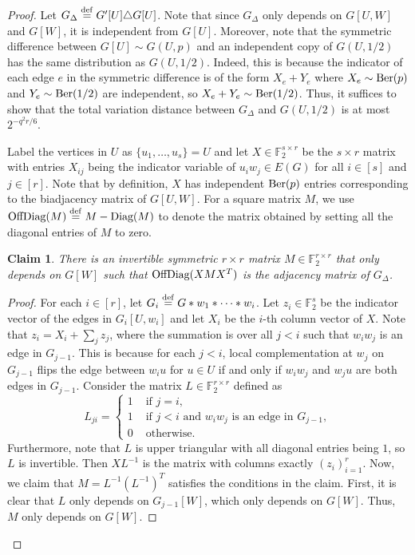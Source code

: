 \documentclass[reqno]{amsart}
\newtheorem{claim}[theorem]{Claim}
\theoremstyle{definition}
\numberwithin{theorem}{section}
\newcommand{\FF}{\mathbb F}
\def\eqdef{\overset{\rm{def}}{=}}
\newcommand{\Ber}{\textup{Ber}}
\newcommand{\OffDiag}{\textup{OffDiag}}
\begin{document}
\begin{proof}
    Let $G_{\Delta}\eqdef G'[U]\triangle G[U]$. 
    Note that since $G_{\Delta}$ only depends on $G[U,W]$ and $G[W]$, it is independent from $G[U]$. Moreover, note that the symmetric difference between $G[U]\sim G(U,p)$ and an independent copy of $G(U,1/2)$ has the same distribution as $G(U,1/2)$. Indeed, this is because the indicator of each edge $e$ in the symmetric difference is of the form $X_e+Y_e$ where $X_e\sim \Ber(p)$ and $Y_e\sim \Ber(1/2)$ are independent, so $X_e+Y_e\sim \Ber(1/2)$. Thus, it suffices to show that the total variation distance between $G_{\Delta}$ and $G(U,1/2)$ is at most $2^{-q^2r/6}$. 
    
    Label the vertices in $U$ as $\{u_1,\dots,u_s\}=U$ and let $X \in\FF_2^{s\times r}$ be the $s\times r$ matrix with entries $X_{ij}$ being the indicator variable of $u_iw_j\in E(G)$ for all $i\in [s]$ and $j\in [r]$. Note that by definition, $X$ has independent $\Ber(p)$ entries corresponding to the biadjacency matrix of $G[U,W]$. For a square matrix $M$, we use $\OffDiag(M)\eqdef M-\textup{Diag}(M)$ to denote the matrix obtained by setting all the diagonal entries of $M$ to zero.
    \begin{claim}\label{claim:M}
        There is an invertible symmetric $r\times r$ matrix $M\in\FF_2^{r\times r}$ that only depends on $G[W]$ such that $\OffDiag(XMX^T)$ is the adjacency matrix of $G_{\Delta}$.
    \end{claim}
    \begin{proof}
        For each $i \in [r]$, let $G_i\eqdef G*w_1*\dots*w_i$. Let $z_i\in\FF_2^s$ be the indicator vector of the edges in $G_i[U,w_i]$ and let $X_i$ be the $i$-th column vector of $X$. Note that $z_i=X_i+\sum_j z_j$, where the summation is over all $j<i$ such that $w_iw_j$ is an edge in $G_{j-1}$. This is because for each $j<i$, local complementation at $w_j$ on $G_{j-1}$ flips the edge between $w_iu$ for $u\in U$ if and only if $w_iw_j$ and $w_ju$ are both edges in $G_{j-1}$. Consider the matrix $L\in\FF_2^{r\times r}$ defined as 
        \[L_{ji}=\begin{cases}
            1&\text{ if }j=i,\\
            1&\text{ if }j<i\text{ and }w_iw_j\text{ is an edge in }G_{j-1},\\
            0&\text{ otherwise}.
        \end{cases}\]
        Furthermore, note that $L$ is upper triangular with all diagonal entries being $1$, so $L$ is invertible. 
        Then $XL^{-1}$ is the matrix with columns exactly $(z_i)_{i=1}^r$. Now, we claim that $M=L^{-1}(L^{-1})^T$ satisfies the conditions in the claim. First, it is clear that $L$ only depends on $G_{j-1}[W]$, which only depends on $G[W]$. Thus, $M$ only depends on $G[W]$.


\end{proof}
\end{proof}
\end{document}
